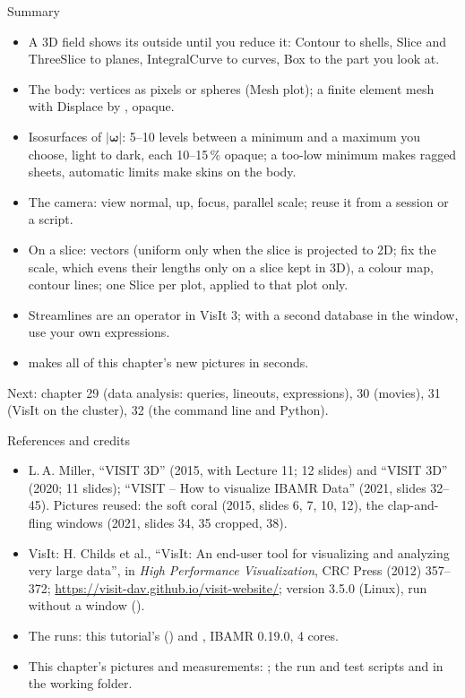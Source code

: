 \documentclass[aspectratio=169,11pt]{beamer}
\begin{document}
\begin{frame}{Summary}
\label{fr:summary}
\footnotesize
\begin{itemize}
  \item A 3D field shows its outside until you reduce it: Contour to shells, Slice and ThreeSlice to planes, IntegralCurve to curves, Box to the part you look at.
  \item The body: vertices as pixels or spheres (Mesh plot); a finite element mesh with Displace by , opaque.
  \item Isosurfaces of $|\boldsymbol{\omega}|$: 5--10 levels between a minimum and a maximum you choose, light to dark, each 10--15\,\% opaque; a too-low minimum makes ragged sheets, automatic limits make skins on the body.
  \item The camera: view normal, up, focus, parallel scale; reuse it from a session or a script.
  \item On a slice: vectors (uniform only when the slice is projected to 2D; fix the scale, which evens their lengths only on a slice kept in 3D), a colour map, contour lines; one Slice per plot, applied to that plot only.
  \item Streamlines are an operator in VisIt 3; with a second database in the window, use your own expressions.
  \item {} makes all of this chapter's new pictures in seconds.
\end{itemize}
\vspace{1mm}
Next: chapter 29 (data analysis: queries, lineouts, expressions), 30 (movies), 31 (VisIt on the cluster), 32 (the command line and Python).
\end{frame}

\begin{frame}{References and credits}
\label{fr:refs}
\scriptsize
\begin{itemize}
  \item L.\,A. Miller, ``VISIT 3D'' (2015, with Lecture 11; 12 slides) and ``VISIT 3D'' (2020; 11 slides); ``VISIT -- How to visualize IBAMR Data'' (2021, slides 32--45). Pictures reused: the soft coral (2015, slides 6, 7, 10, 12), the clap-and-fling windows (2021, slides 34, 35 cropped, 38).
  \item VisIt: H. Childs et al., ``VisIt: An end-user tool for visualizing and analyzing very large data'', in \emph{High Performance Visualization}, CRC Press (2012) 357--372; \url{https://visit-dav.github.io/visit-website/}; version 3.5.0 (Linux), run without a window ().
  \item The runs: this tutorial's  () and , IBAMR 0.19.0, 4 cores.
  \item This chapter's pictures and measurements: ; the run and test scripts  and  in the working folder.
\end{itemize}
\end{frame}
\end{document}
